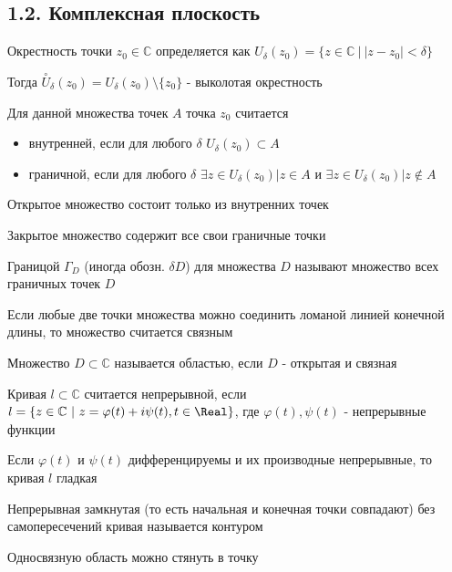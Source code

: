 \subsection{1.2. Комплексная плоскость}

\Def Окрестность точки $z_0 \in \mathbb{C}$ определяется как $U_\delta (z_0) = \{z \in \mathbb{C} \ \Big| \ |z - z_0| < \delta\}$

Тогда $\overset{\circ}{U}_\delta (z_0) = U_\delta (z_0) \setminus \{ z_0 \}$ - выколотая окрестность

\Def Для данной множества точек $A$ точка $z_0$ считается

\begin{itemize}
    \item внутренней, если для любого $\delta$ $U_\delta (z_0) \subset A$
    \item граничной, если для любого $\delta$ $\exists z \in U_\delta (z_0) \Big| z \in A$ и $\exists z \in U_\delta (z_0) \Big| z \notin A$
\end{itemize}

\Def Открытое множество состоит только из внутренних точек

\Def Закрытое множество содержит все свои граничные точки

\Def Границой $\Gamma_D$ (иногда обозн. $\delta D$) для множества $D$ называют множество всех граничных точек $D$

\Def Если любые две точки множества можно соединить ломаной линией конечной длины, то множество считается связным

\Def Множество $D \subset \mathbb{C}$ называется областью, если $D$ - открытая и связная

\Def Кривая $l \subset \mathbb{C}$ считается непрерывной, если $l = \{z \in \mathbb{C} \ | \ z = \varphi(t) + i \psi(t), t \in \Real\}$, где $\varphi(t), \psi(t)$ - непрерывные функции

\Nota Если $\varphi(t)$ и $\psi(t)$ дифференцируемы и их производные непрерывные, то кривая $l$ гладкая

\Def Непрерывная замкнутая (то есть начальная и конечная точки совпадают) без самопересечений кривая называется контуром

\Nota Односвязную область можно стянуть в точку

